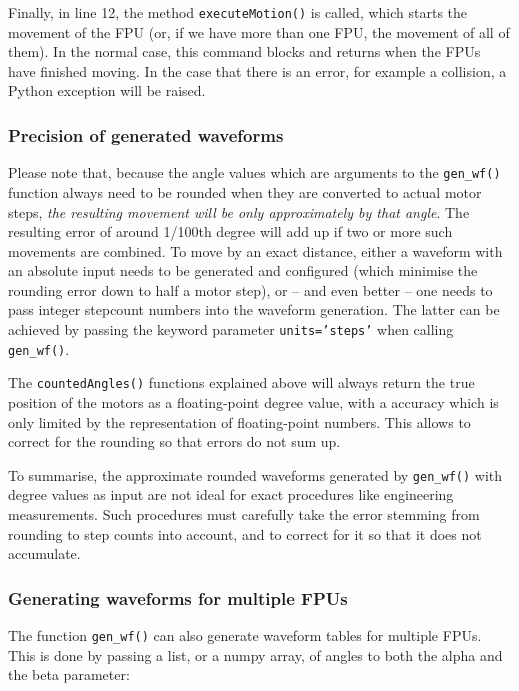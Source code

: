\documentclass[11pt,a4paper]{report}
\begin{document}
Finally, in line 12, the method \texttt{executeMotion()} is called,
which starts the movement of the FPU (or, if we have more than one
FPU, the movement of all of them). In the normal case, this command
blocks and returns when the FPUs have finished moving.  In the case
that there is an error, for example a collision, a Python exception
will be raised.

\subsubsection{Precision of generated waveforms}

%
Please note that, because the angle values which are arguments to the
\texttt{gen\_wf()} function always need to be rounded when they are
converted to actual motor steps, \emph{the resulting movement will be
  only approximately by that angle}. The resulting error of around
1/100th degree will add up if two or more such movements are
combined. To move by an exact distance, either a waveform with an
absolute input needs to be generated and configured (which minimise
the rounding error down to half a motor step), or -- and even better
-- one needs to pass integer stepcount numbers into the waveform
generation. The latter can be achieved by passing the keyword
parameter \texttt{units='steps'} when calling \texttt{gen\_wf()}.

The \texttt{countedAngles()} functions explained above will always
return the true position of the motors as a floating-point degree
value, with a accuracy which is only limited by the representation of
floating-point numbers. This allows to correct for the rounding so
that errors do not sum up.

To summarise, the approximate rounded waveforms generated by
\texttt{gen\_wf()} with degree values as input are not ideal for exact
procedures like engineering measurements. Such procedures must
carefully take the error stemming from rounding to step counts into
account, and to correct for it so that it does not accumulate.

\subsubsection{Generating waveforms for multiple FPUs}
The function \texttt{gen\_wf()} can also generate waveform tables for
multiple FPUs. This is done by passing a list, or a numpy array,
of angles to both the alpha and the beta parameter:
\end{document}
